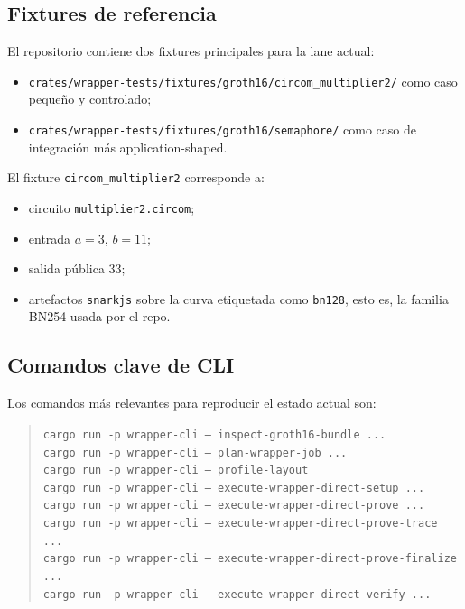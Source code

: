 \documentclass[11pt,a4paper]{article}
\begin{document}
\subsection{Fixtures de referencia}

El repositorio contiene dos fixtures principales para la lane actual:

\begin{itemize}
  \item \texttt{crates/wrapper-tests/fixtures/groth16/circom\_multiplier2/}
  como caso peque\~no y controlado;
  \item \texttt{crates/wrapper-tests/fixtures/groth16/semaphore/}
  como caso de integraci\'on m\'as application-shaped.
\end{itemize}

El fixture \texttt{circom\_multiplier2} corresponde a:

\begin{itemize}
  \item circuito \texttt{multiplier2.circom};
  \item entrada \(a = 3\), \(b = 11\);
  \item salida p\'ublica \(33\);
  \item artefactos \texttt{snarkjs} sobre la curva etiquetada como \texttt{bn128}, esto es, la familia BN254 usada por el repo.
\end{itemize}

\subsection{Comandos clave de CLI}

Los comandos m\'as relevantes para reproducir el estado actual son:

\begin{quote}
\texttt{cargo run -p wrapper-cli -- inspect-groth16-bundle ...}\\
\texttt{cargo run -p wrapper-cli -- plan-wrapper-job ...}\\
\texttt{cargo run -p wrapper-cli -- profile-layout}\\
\texttt{cargo run -p wrapper-cli -- execute-wrapper-direct-setup ...}\\
\texttt{cargo run -p wrapper-cli -- execute-wrapper-direct-prove ...}\\
\texttt{cargo run -p wrapper-cli -- execute-wrapper-direct-prove-trace ...}\\
\texttt{cargo run -p wrapper-cli -- execute-wrapper-direct-prove-finalize ...}\\
\texttt{cargo run -p wrapper-cli -- execute-wrapper-direct-verify ...}
\end{quote}
\end{document}
